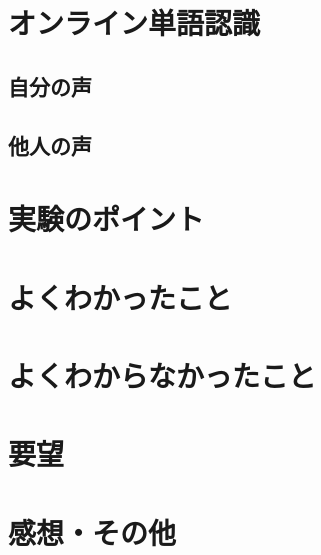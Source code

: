 \documentclass[11pt,a4paper, uplatex]{jsarticle}
\begin{document}
\section{オンライン単語認識}
\subsection{自分の声}
\subsection{他人の声}


\section{実験のポイント}


\section{よくわかったこと}


\section{よくわからなかったこと}


\section{要望}

\section{感想・その他}
\end{document}
